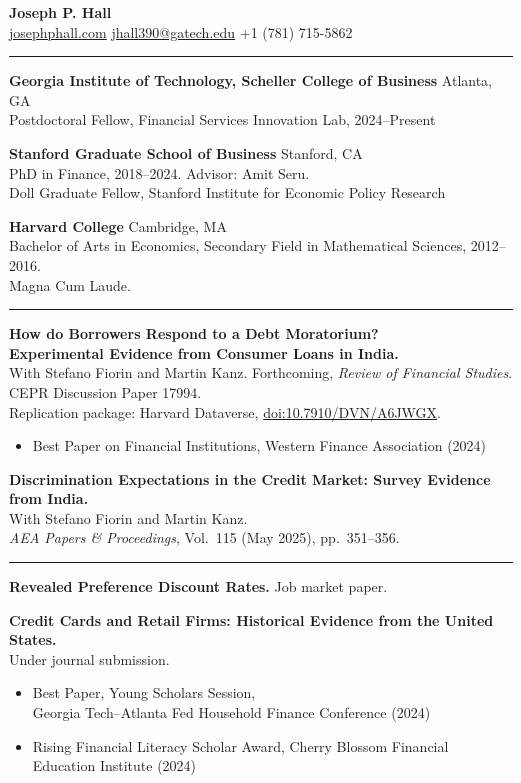\documentclass[11pt]{article}
\newcommand{\cvsection}[1]{\needspace{3.5\baselineskip}\vspace{0.5em}{\large\scshape #1}\par\vspace{-0.45em}\rule{\linewidth}{0.4pt}\par\vspace{0.25em}}
\newcommand{\entry}[3]{\noindent\textbf{#1} \hfill #2\\ #3\par\vspace{0.35em}}
\begin{document}
\begin{center}
{\LARGE \textbf{Joseph P. Hall}}\\[0.3em]
\href{https://josephphall.com}{josephphall.com} \quad
\href{mailto:jhall390@gatech.edu}{jhall390@gatech.edu} \quad +1 (781) 715-5862
\end{center}

\cvsection{Academic Background}

\entry{Georgia Institute of Technology, Scheller College of Business}{Atlanta, GA}{Postdoctoral Fellow, Financial Services Innovation Lab, 2024--Present}
\entry{Stanford Graduate School of Business}{Stanford, CA}{PhD in Finance, 2018--2024. Advisor: Amit Seru.\\ Doll Graduate Fellow, Stanford Institute for Economic Policy Research}
\entry{Harvard College}{Cambridge, MA}{Bachelor of Arts in Economics, Secondary Field in Mathematical Sciences, 2012--2016.\\ Magna Cum Laude.}

\cvsection{Published and Forthcoming}

\textbf{How do Borrowers Respond to a Debt Moratorium?\\
Experimental Evidence from Consumer Loans in India.}\\
With Stefano Fiorin and Martin Kanz. Forthcoming, \emph{Review of Financial Studies}.\\
CEPR Discussion Paper 17994.\\
Replication package: Harvard Dataverse, \href{https://doi.org/10.7910/DVN/A6JWGX}{doi:10.7910/DVN/A6JWGX}.
\begin{itemize}
\item Best Paper on Financial Institutions, Western Finance Association (2024)
\end{itemize}

\textbf{Discrimination Expectations in the Credit Market: Survey Evidence from India.}\\
With Stefano Fiorin and Martin Kanz.\\
\emph{AEA Papers \& Proceedings}, Vol.\ 115 (May 2025), pp.\ 351--356.

\cvsection{Working Papers}

\textbf{Revealed Preference Discount Rates.} Job market paper.

\textbf{Credit Cards and Retail Firms: Historical Evidence from the United States.}\\
Under journal submission.
\begin{itemize}
\item Best Paper, Young Scholars Session,\\
Georgia Tech--Atlanta Fed Household Finance Conference (2024)
\item Rising Financial Literacy Scholar Award, Cherry Blossom Financial Education Institute (2024)
\end{itemize}
\end{document}
